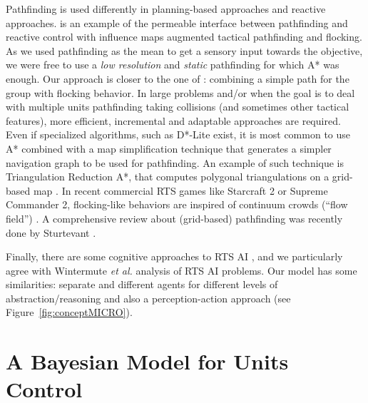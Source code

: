 Pathfinding is used differently in planning-based approaches and reactive approaches. \cite{Danielsiek_2008} is an example of the permeable interface between pathfinding and reactive control with influence maps augmented tactical pathfinding and flocking. As we used pathfinding as the mean to get a sensory input towards the objective, we were free to use a \textit{low resolution} and \textit{static} pathfinding for which A* was enough. Our approach is closer to the one of \citep{Reynolds_1999}: combining a simple path for the group with flocking behavior. In large problems and/or when the goal is to deal with multiple units pathfinding taking collisions (and sometimes other tactical features), more efficient, incremental and adaptable approaches are required. 
Even if specialized algorithms, such as D*-Lite \cite{KoenigL02} exist, it is most common to use A* combined with a map simplification technique that generates a simpler navigation graph to be used for pathfinding. An example of such technique is Triangulation Reduction A*, that computes polygonal triangulations on a grid-based map \cite{Demyen_2006}. In recent commercial RTS games like Starcraft 2 or Supreme Commander 2, flocking-like behaviors are inspired of continuum crowds (``flow field'') \cite{Treuille2006}. A comprehensive review about (grid-based) pathfinding was recently done by Sturtevant \cite{sturtevant2012benchmarks}.


Finally, there are some cognitive approaches to RTS AI \citep{SORTS}, and we particularly agree with Wintermute \textit{et al.} analysis of RTS AI problems. Our model has some similarities: separate and different agents for different levels of abstraction/reasoning and also a perception-action approach (see Figure~\ref{fig:conceptMICRO}).


\section{A Bayesian Model for Units Control}



